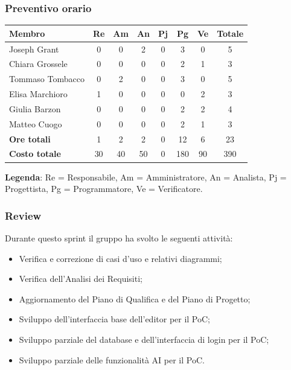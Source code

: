 \documentclass[11pt,a4paper]{article}
\begin{document}
\subsubsection{Preventivo orario}
\begin{center}
    \begin{tabular}{|l|c|c|c|c|c|c|c|}
        \hline
        \textbf{Membro} & \textbf{Re} & \textbf{Am} & \textbf{An} & \textbf{Pj} & \textbf{Pg} & \textbf{Ve} & \textbf{Totale} \\
        \hline
        Joseph Grant & 0 & 0 & 2 & 0 & 3 & 0 & 5 \\
        \hline
        Chiara Grossele & 0 & 0 & 0 & 0 & 2 & 1 & 3 \\
        \hline
        Tommaso Tombacco & 0 & 2 & 0 & 0 & 3 & 0 & 5 \\
        \hline
        Elisa Marchioro & 1 & 0 & 0 & 0 & 0 & 2 & 3 \\
        \hline
        Giulia Barzon & 0 & 0 & 0 & 0 & 2 & 2 & 4 \\
        \hline
        Matteo Cuogo & 0 & 0 & 0 & 0 & 2 & 1 & 3 \\
        \hline
        \textbf{Ore totali} & 1 & 2 & 2 & 0 & 12 & 6 & 23 \\
        \hline
        \textbf{Costo totale} & 30 & 40 & 50 & 0 & 180 & 90 & 390 \\
        \hline
    \end{tabular}
\end{center}

\noindent \textbf{Legenda}: Re = Responsabile, Am = Amministratore, An = Analista, Pj = Progettista, Pg = Programmatore, Ve = Verificatore.

\subsubsection{Review}
Durante questo sprint il gruppo ha svolto le seguenti attività:
\begin{itemize}
    \item Verifica e correzione di casi d'uso e relativi diagrammi;
    \item Verifica dell'Analisi dei Requisiti;
    \item Aggiornamento del Piano di Qualifica e del Piano di Progetto;
    \item Sviluppo dell'interfaccia base dell'editor per il PoC;
    \item Sviluppo parziale del database e dell'interfaccia di login per il PoC;
    \item Sviluppo parziale delle funzionalità AI per il PoC.
\end{itemize}
\end{document}
